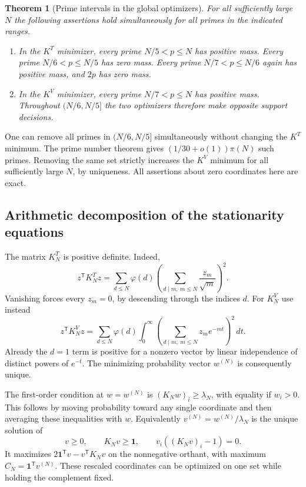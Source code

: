 \documentclass[11pt,a4paper]{article}
\newtheorem{theorem}{Theorem}[section]
\begin{document}
\begin{theorem}[Prime intervals in the global optimizers]\label{thm:gal-primes}
For all sufficiently large $N$ the following assertions hold simultaneously for all primes in the indicated ranges.
\begin{enumerate}
\item In the $K^T$ minimizer, every prime $N/5<p\le N$ has positive mass. Every prime $N/6<p\le N/5$ has zero mass. Every prime $N/7<p\le N/6$ again has positive mass, and $2p$ has zero mass.
\item In the $K^V$ minimizer, every prime $N/7<p\le N$ has positive mass. Throughout $(N/6,N/5]$ the two optimizers therefore make opposite support decisions.
\end{enumerate}
\end{theorem}

One can remove all primes in $(N/6,N/5]$ simultaneously without changing the $K^T$ minimum. The prime number theorem gives $(1/30+o(1))\pi(N)$ such primes. Removing the same set strictly increases the $K^V$ minimum for all sufficiently large $N$, by uniqueness. All assertions about zero coordinates here are exact.

\subsection{Arithmetic decomposition of the stationarity equations}
The matrix $K^T_N$ is positive definite. Indeed,
\[
 z^{\mathsf T}K^T_Nz=\sum_{d\le N}\varphi(d)
    \left(\sum_{d\mid m,\ m\le N}\frac{z_m}{\sqrt m}\right)^2 .
\]
Vanishing forces every $z_m=0$, by descending through the indices $d$. For $K^V_N$ use instead
\[
 z^{\mathsf T}K^V_Nz=\sum_{d\le N}\varphi(d)\int_0^\infty
    \left(\sum_{d\mid m,\ m\le N}z_m e^{-mt}\right)^2\,dt.
\]
Already the $d=1$ term is positive for a nonzero vector by linear independence of distinct powers of $e^{-t}$. The minimizing probability vector $w^{(N)}$ is consequently unique.

The first-order condition at $w=w^{(N)}$ is $(K_Nw)_i\ge\lambda_N$, with equality if $w_i>0$. This follows by moving probability toward any single coordinate and then averaging these inequalities with $w$. Equivalently $v^{(N)}=w^{(N)}/\lambda_N$ is the unique solution of
\begin{equation}\label{eq:gal-obstacle}
 v\ge0,\qquad K_Nv\ge\boldsymbol1,\qquad v_i((K_Nv)_i-1)=0 .
\end{equation}
It maximizes $2\boldsymbol1^{\mathsf T}v-v^{\mathsf T}K_Nv$ on the nonnegative orthant, with maximum $C_N=\boldsymbol1^{\mathsf T}v^{(N)}$. These rescaled coordinates can be optimized on one set while holding the complement fixed.
\end{document}
